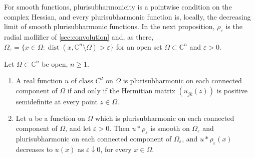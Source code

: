 For smooth functions, plurisubharmonicity is a pointwise condition on the complex Hessian, and every plurisubharmonic function is, locally, the decreasing limit of smooth plurisubharmonic functions. In the next proposition, $\rho_\varepsilon$ is the radial mollifier of \cref{sec:convolution} and, as there, $\Omega_\varepsilon=\{x\in\Omega:\operatorname{dist}(x,\mathbb C^n\setminus\Omega)>\varepsilon\}$ for an open set $\Omega\subset\mathbb C^n$ and $\varepsilon>0$.

\begin{proposition}\label{prop:smooth-psh-criterion}
Let $\Omega\subset\mathbb{C}^n$ be open, $n\geq1$.
\begin{enumerate}
\item A real function $u$ of class $C^2$ on $\Omega$ is plurisubharmonic on each connected component of $\Omega$ if and only if the Hermitian matrix $(u_{j\bar k}(z))$ is positive semidefinite at every point $z\in\Omega$.
\item Let $u$ be a function on $\Omega$ which is plurisubharmonic on each connected component of $\Omega$, and let $\varepsilon>0$. Then $u*\rho_\varepsilon$ is smooth on $\Omega_\varepsilon$ and plurisubharmonic on each connected component of $\Omega_\varepsilon$, and $u*\rho_\varepsilon(x)$ decreases to $u(x)$ as $\varepsilon\downarrow0$, for every $x\in\Omega$.
\end{enumerate}
\end{proposition}
